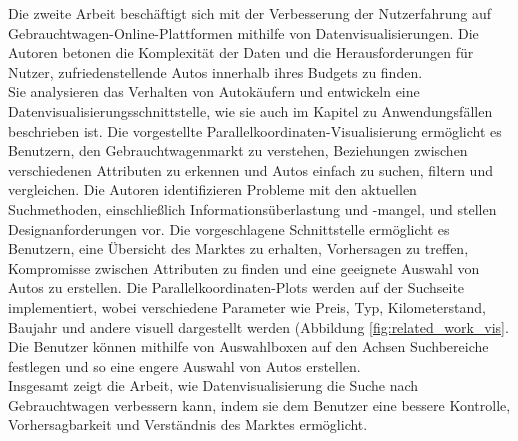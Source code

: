Die zweite Arbeit \cite{chen2017employing} beschäftigt sich mit der Verbesserung der Nutzerfahrung auf Gebrauchtwagen-Online-Plattformen mithilfe von Datenvisualisierungen. Die Autoren betonen die Komplexität der Daten und die Herausforderungen für Nutzer, zufriedenstellende Autos innerhalb ihres Budgets zu finden. \\

Sie analysieren das Verhalten von Autokäufern und entwickeln eine Datenvisualisierungsschnittstelle, wie sie auch im Kapitel zu Anwendungsfällen beschrieben ist. Die vorgestellte Parallelkoordinaten-Visualisierung ermöglicht es Benutzern, den Gebrauchtwagenmarkt zu verstehen, Beziehungen zwischen verschiedenen Attributen zu erkennen und Autos einfach zu suchen, filtern und vergleichen. Die Autoren identifizieren Probleme mit den aktuellen Suchmethoden, einschließlich Informationsüberlastung und -mangel, und stellen Designanforderungen vor. Die vorgeschlagene Schnittstelle ermöglicht es Benutzern, eine Übersicht des Marktes zu erhalten, Vorhersagen zu treffen, Kompromisse zwischen Attributen zu finden und eine geeignete Auswahl von Autos zu erstellen. Die Parallelkoordinaten-Plots werden auf der Suchseite implementiert, wobei verschiedene Parameter wie Preis, Typ, Kilometerstand, Baujahr und andere visuell dargestellt werden (Abbildung \ref{fig:related_work_vis}. Die Benutzer können mithilfe von Auswahlboxen auf den Achsen Suchbereiche festlegen und so eine engere Auswahl von Autos erstellen.\\
Insgesamt zeigt die Arbeit, wie Datenvisualisierung die Suche nach Gebrauchtwagen verbessern kann, indem sie dem Benutzer eine bessere Kontrolle, Vorhersagbarkeit und Verständnis des Marktes ermöglicht. \\


